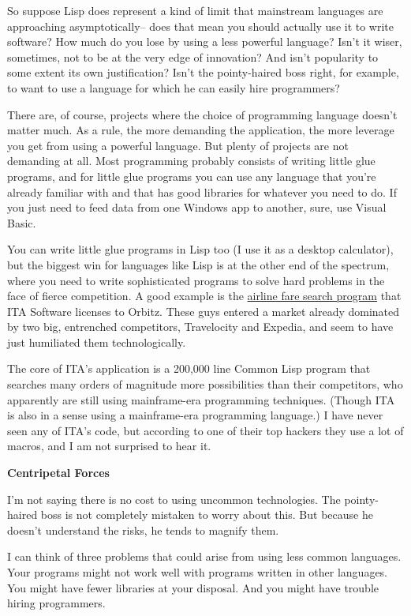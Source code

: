 So suppose Lisp does represent a kind of limit that mainstream languages
are approaching asymptotically-- does that mean you should actually use
it to write software? How much do you lose by using a less powerful
language? Isn't it wiser, sometimes, not to be at the very edge of
innovation? And isn't popularity to some extent its own justification?
Isn't the pointy-haired boss right, for example, to want to use a
language for which he can easily hire programmers?

There are, of course, projects where the choice of programming language
doesn't matter much. As a rule, the more demanding the application, the
more leverage you get from using a powerful language. But plenty of
projects are not demanding at all. Most programming probably consists of
writing little glue programs, and for little glue programs you can use
any language that you're already familiar with and that has good
libraries for whatever you need to do. If you just need to feed data
from one Windows app to another, sure, use Visual Basic.

You can write little glue programs in Lisp too (I use it as a desktop
calculator), but the biggest win for languages like Lisp is at the other
end of the spectrum, where you need to write sophisticated programs to
solve hard problems in the face of fierce competition. A good example is
the \href{carl.html}{airline fare search program} that ITA Software
licenses to Orbitz. These guys entered a market already dominated by two
big, entrenched competitors, Travelocity and Expedia, and seem to have
just humiliated them technologically.

The core of ITA's application is a 200,000 line Common Lisp program that
searches many orders of magnitude more possibilities than their
competitors, who apparently are still using mainframe-era programming
techniques. (Though ITA is also in a sense using a mainframe-era
programming language.) I have never seen any of ITA's code, but
according to one of their top hackers they use a lot of macros, and I am
not surprised to hear it.

\textbf{Centripetal Forces}

I'm not saying there is no cost to using uncommon technologies. The
pointy-haired boss is not completely mistaken to worry about this. But
because he doesn't understand the risks, he tends to magnify them.

I can think of three problems that could arise from using less common
languages. Your programs might not work well with programs written in
other languages. You might have fewer libraries at your disposal. And
you might have trouble hiring programmers.

